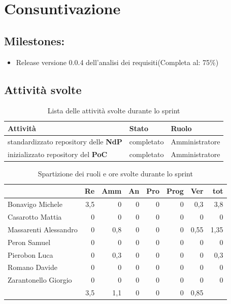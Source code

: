 \section{Consuntivazione}

\subsection{Milestones:}
\begin{itemize}
    \item Release versione 0.0.4 dell'analisi dei requisiti(Completa al: 75\%)
\end{itemize}

\subsection{Attività svolte}

\begin{table}[ht]
    \begin{tabularx}{\textwidth}{X l l}
        
        \rowcolor{gray!30} \textbf{Attività} & \textbf{Stato} & \textbf{Ruolo}\\
        
        \hline
        standardizzato repository delle \textbf{NdP} & completato & Amministratore\\
        inizializzato repository del \textbf{PoC} & completato & Amministratore\\
        \end{tabularx}
    \caption{Lista delle attività svolte durante lo sprint}
\end{table}


\begin{table}[ht]
    \begin{tabularx}{\linewidth}{X|rrrrrrr}
    \rowcolor{gray!30}& Re & Amm & An & Pro & Prog & Ver & tot \\
    \hline
    Bonavigo Michele                        & 3,5 & 0 & 0 & 0 & 0 & 0,3  & 3,8 \\
    \rowcolor{gray!10}Casarotto Mattia      & 0 & 0 & 0 & 0 & 0 & 0  & 0 \\
    Massarenti Alessandro                   & 0 & 0,8 & 0 & 0 & 0 & 0,55  & 1,35 \\
    \rowcolor{gray!10}Peron Samuel          & 0 & 0 & 0 & 0 & 0 & 0 & 0 \\
    Pierobon Luca                           & 0 & 0,3 & 0 & 0 & 0 & 0 & 0,3 \\
    \rowcolor{gray!10}Romano Davide         & 0 & 0 & 0 & 0 & 0 & 0 & 0 \\
    Zarantonello Giorgio                    & 0 & 0 & 0 & 0 & 0 & 0 & 0 \\
    \hline                                  & 3,5 & 1,1 & 0 & 0 & 0 & 0,85 & 
    \end{tabularx}
    \caption{\label{ruoli-persone}Spartizione dei ruoli e ore svolte durante lo sprint}
\end{table}

